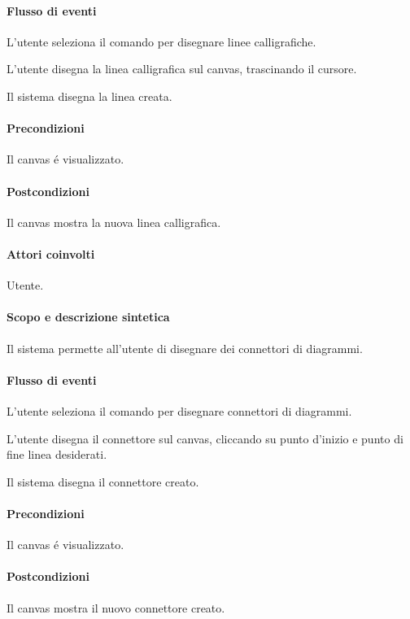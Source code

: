 \paragraph{Flusso di eventi}
\begin{elenconumerato}[\textbf{}]{\subsubsecindent}
\item L'utente seleziona il comando per disegnare linee calligrafiche.
\item L'utente disegna la linea calligrafica sul canvas, trascinando il cursore.
\item Il sistema disegna la linea creata.
\end{elenconumerato}
\paragraph{Precondizioni} Il canvas \'e visualizzato.
\paragraph{Postcondizioni} Il canvas mostra la nuova linea calligrafica.

\paragraph{Attori coinvolti} Utente.
\paragraph{Scopo e descrizione sintetica} 
Il sistema permette all'utente di disegnare dei connettori di diagrammi.
\paragraph{Flusso di eventi}
\begin{elenconumerato}[\textbf{}]{\subsubsecindent}
\item L'utente seleziona il comando per disegnare connettori di diagrammi.
\item L'utente disegna il connettore sul canvas, cliccando su punto d'inizio e punto di fine linea desiderati.
\item Il sistema disegna il connettore creato.
\end{elenconumerato}
\paragraph{Precondizioni} Il canvas \'e visualizzato.
\paragraph{Postcondizioni} Il canvas mostra il nuovo connettore creato.

